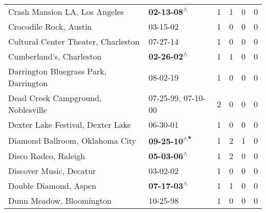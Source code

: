 \begin{supertabular}{p{0.4\textwidth}p{0.3\textwidth}p{0.05\textwidth}p{0.05\textwidth}p{0.05\textwidth}p{0.05\textwidth}}
                                                Crash Mansion LA, Los Angeles &                                                 \textbf{02-13-08\textsuperscript{$\wedge$}} &  1 &  1 &  0 &  0 \\
                                                       Crocodile Rock, Austin &                                                                  03-15-02\textsuperscript{} &  1 &  0 &  0 &  0 \\
                                          Cultural Center Theater, Charleston &                                                                  07-27-14\textsuperscript{} &  1 &  0 &  0 &  0 \\
                                                     Cumberland's, Charleston &                                                 \textbf{02-26-02\textsuperscript{$\wedge$}} &  1 &  1 &  0 &  0 \\
                                        Darrington Bluegrass Park, Darrington &                                                                  08-02-19\textsuperscript{} &  1 &  0 &  0 &  0 \\
                                           Dead Creek Campground, Noblesville &                                      07-25-99\textsuperscript{}, 07-10-00\textsuperscript{} &  2 &  0 &  0 &  0 \\
                                            Dexter Lake Festival, Dexter Lake &                                                                  06-30-01\textsuperscript{} &  1 &  0 &  0 &  0 \\
                                              Diamond Ballroom, Oklahoma City &                                                \textbf{09-25-10\textsuperscript{$\wedge$*}} &  1 &  2 &  1 &  0 \\
                                                         Disco Rodeo, Raleigh &                                                 \textbf{05-03-06\textsuperscript{$\wedge$}} &  1 &  2 &  0 &  0 \\
                                                      Discover Music, Decatur &                                                                  03-02-02\textsuperscript{} &  1 &  0 &  0 &  0 \\
                                                        Double Diamond, Aspen &                                                 \textbf{07-17-03\textsuperscript{$\wedge$}} &  1 &  1 &  0 &  0 \\
                                                     Dunn Meadow, Bloomington &                                                                  10-25-98\textsuperscript{} &  1 &  0 &  0 &  0 \\

\end{supertabular}

